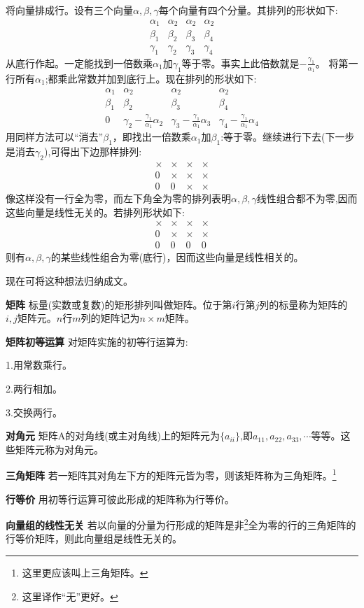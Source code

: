将向量排成行。设有三个向量$\alpha,\beta,\gamma$每个向量有四个分量。其排列的形状如下:
\[
\begin{array}{cccc}
    \alpha_1 & \alpha_2 & \alpha_2 & \alpha_2 \\
    \beta_1 & \beta_2 & \beta_3 & \beta_4 \\
    \gamma_1 & \gamma_2 & \gamma_3 & \gamma_4
\end{array}    
\]
从底行作起。一定能找到一倍数乘$\alpha_1$加$\gamma_1$等于零。事实上此倍数就是$-\frac{\gamma_1}{\alpha_1}$。
将第一行所有$\alpha_1$;都乘此常数并加到底行上。现在排列的形状如下:
\[
\begin{array}{llll}
    \alpha_1 & \alpha_2 & \alpha_2 & \alpha_2 \\
    \beta_1 & \beta_2 & \beta_3 & \beta_4 \\
    0 & \gamma_2-\frac{\gamma_1}{\alpha_1}\alpha_2 & \gamma_3-\frac{\gamma_1}{\alpha_1}\alpha_3 & \gamma_4-\frac{\gamma_1}{\alpha_1}\alpha_4
\end{array}    
\]
用同样方法可以“消去”$\beta_1$，即找出一倍数乘$\alpha_1$加$\beta_1$:等于零。继续进行下去(下一步是消去$\gamma_2$),可得出下边那样排列:
\[
\begin{array}{llll}
    \times & \times & \times & \times \\
    0 & \times & \times & \times \\
    0 & 0 & \times & \times
\end{array}    
\]
像这样没有一行全为零，而左下角全为零的排列表明$\alpha,\beta,\gamma$线性组合都不为零,因而这些向量是线性无关的。若排列形状如下:
\[
\begin{array}{llll}
    \times & \times & \times & \times \\
    0 & \times & \times & \times \\
    0 & 0 & 0 & 0
\end{array}    
\]
则有$\alpha,\beta,\gamma$的某些线性组合为零(底行)，因而这些向量是线性相关的。

现在可将这种想法归纳成文。

\begin{definition}
    \textbf{矩阵} \quad 标量(实数或复数)的矩形排列叫做矩阵。位于第$i$行第$j$列的标量称为矩阵的$i,j$矩阵元。$n$行$m$列的矩阵记为$n \times m$矩阵。

    \textbf{矩阵初等运算} \quad 对矩阵实施的初等行运算为:

    1.用常数乘行。
    
    2.两行相加。
    
    3.交换两行。

    \textbf{对角元} \quad 矩阵A的对角线(或主对角线)上的矩阵元为$\{a_{ii}\}$,即$a_{11},a_{22},a_{33},\cdots$等等。这些矩阵元称为对角元。
    
    \textbf{三角矩阵} \quad 若一矩阵其对角左下方的矩阵元皆为零，则该矩阵称为三角矩阵。\footnote{这里更应该叫上三角矩阵。}

    \textbf{行等价} \quad 用初等行运算可彼此形成的矩阵称为行等价。

    \textbf{向量组的线性无关} \quad 若以向量的分量为行形成的矩阵是非\footnote{这里译作“无”更好。}全为零的行的三角矩阵的行等价矩阵，则此向量组是线性无关的。
\end{definition}


